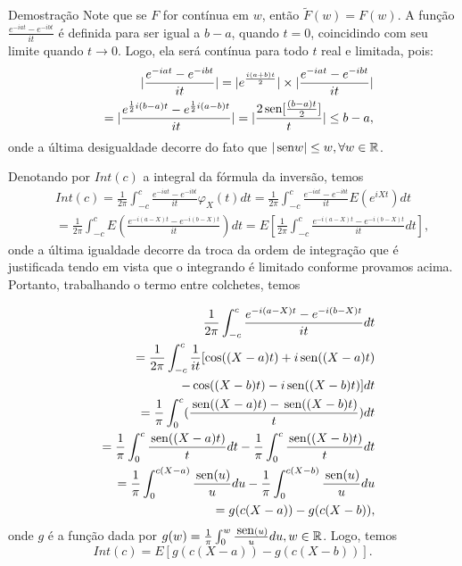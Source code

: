 \begin{frame}
\begin{block}{Demostração}
Note que se $F$ for contínua em $w$, então $\tilde{F}(w)=F(w)$. A função $\frac{e^{-iat}-e^{-ibt}}{it}$ é definida para ser igual a $b-a$, quando $t=0$, coincidindo com seu limite quando $t\rightarrow 0$. Logo, ela será contínua para todo $t$ real e limitada, pois:
\begin{eqnarray}
& & |\frac{e^{-iat}-e^{-ibt}}{it}|=|e^{\frac{i(a+b)t}{2}}|\times |\frac{e^{-iat}-e^{-ibt}}{it}| \nonumber \\
& & =|\frac{e^{\frac{1}{2}i(b-a)t}-e^{\frac{1}{2}i(a-b)t}}{it}|=|\frac{2\mbox{\,sen}[\frac{(b-a)t}{2}]}{t}|\leq b-a, \nonumber
\end{eqnarray}
onde a última desigualdade decorre do fato que $|\mbox{\,sen}w|\leq w,\forall w\in\mathbb{R}$.

Denotando por $Int(c)$ a integral da fórmula da inversão, temos
\begin{eqnarray}
& & Int(c)=\frac{1}{2\pi}\int_{-c}^{c}\frac{e^{-iat}-e^{-ibt}}{it}\varphi_X(t)dt= \frac{1}{2\pi}\int_{-c}^{c}\frac{e^{-iat}-e^{-ibt}}{it}E(e^{iXt})dt \nonumber \\
& & =\frac{1}{2\pi}\int_{-c}^{c}E(\frac{e^{-i(a-X)t}-e^{-i(b-X)t}}{it})dt=E[\frac{1}{2\pi}\int_{-c}^{c}\frac{e^{-i(a-X)t}-e^{-i(b-X)t}}{it}dt],\nonumber
\end{eqnarray}
onde a última igualdade decorre da troca da ordem de integração que é justificada tendo em vista que o integrando é limitado conforme provamos acima. Portanto, trabalhando o termo entre colchetes, temos
\end{block}
\end{frame}

\begin{frame}
\begin{block}{}
\begin{eqnarray}
& & \frac{1}{2\pi}\int_{-c}^{c}\frac{e^{-i(a-X)t}-e^{-i(b-X)t}}{it}dt\nonumber\\
& & =\frac{1}{2\pi}\int_{-c}^{c}\frac{1}{it}[\cos((X-a)t)+i\mbox{\,sen}((X-a)t)\nonumber\\
& & -\cos((X-b)t)-i\mbox{\,sen}((X-b)t)]dt \nonumber\\
& & =\frac{1}{\pi}\int_{0}^{c}(\frac{\mbox{\,sen}((X-a)t)-\mbox{\,sen}((X-b)t)}{t})dt \nonumber \\
& & =\frac{1}{\pi}\int_{0}^{c}\frac{\mbox{\,sen}((X-a)t)}{t}dt -\frac{1}{\pi}\int_{0}^{c} \frac{\mbox{\,sen}((X-b)t)}{t}dt \nonumber \\
& & =\frac{1}{\pi}\int_{0}^{c(X-a)}\frac{\mbox{\,sen}(u)}{u}du -\frac{1}{\pi}\int_{0}^{c(X-b)} \frac{\mbox{\,sen}(u)}{u}du \nonumber \\
& & =g(c(X-a))-g(c(X-b)), \nonumber
\end{eqnarray}
onde $g$ é a função dada por $g(w)=\frac{1}{\pi}\int_{0}^{w}\frac{\mbox{\,sen}(u)}{u}du, w\in\mathbb{R}$. Logo, temos
$$Int(c)=E[g(c(X-a))-g(c(X-b))].$$

\end{block}
\end{frame}


